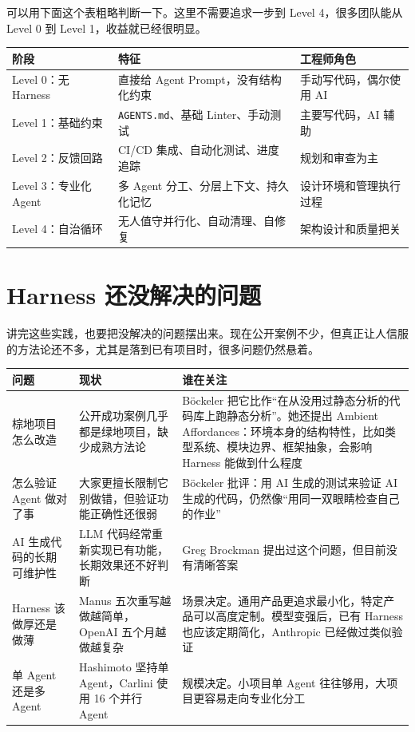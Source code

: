 \documentclass[10pt,a4paper]{ctexart}
\begin{document}
可以用下面这个表粗略判断一下。这里不需要追求一步到 Level 4，很多团队能从 Level 0 到 Level 1，收益就已经很明显。


{\footnotesize
\begin{tabularx}{\textwidth}{|X|X|X|}
\hline
\textbf{阶段} & \textbf{特征} & \textbf{工程师角色} \\
\hline
Level 0：无 Harness & 直接给 Agent Prompt，没有结构化约束 & 手动写代码，偶尔使用 AI \\
\hline
Level 1：基础约束 & \texttt{AGENTS.md}、基础 Linter、手动测试 & 主要写代码，AI 辅助 \\
\hline
Level 2：反馈回路 & CI/CD 集成、自动化测试、进度追踪 & 规划和审查为主 \\
\hline
Level 3：专业化 Agent & 多 Agent 分工、分层上下文、持久化记忆 & 设计环境和管理执行过程 \\
\hline
Level 4：自治循环 & 无人值守并行化、自动清理、自修复 & 架构设计和质量把关 \\
\hline
\end{tabularx}
}



\section{Harness 还没解决的问题}


讲完这些实践，也要把没解决的问题摆出来。现在公开案例不少，但真正让人信服的方法论还不多，尤其是落到已有项目时，很多问题仍然悬着。


{\footnotesize
\begin{tabularx}{\textwidth}{|X|X|X|}
\hline
\textbf{问题} & \textbf{现状} & \textbf{谁在关注} \\
\hline
棕地项目怎么改造 & 公开成功案例几乎都是绿地项目，缺少成熟方法论 & Böckeler 把它比作“在从没用过静态分析的代码库上跑静态分析”。她还提出 Ambient Affordances：环境本身的结构特性，比如类型系统、模块边界、框架抽象，会影响 Harness 能做到什么程度 \\
\hline
怎么验证 Agent 做对了事 & 大家更擅长限制它别做错，但验证功能正确性还很弱 & Böckeler 批评：用 AI 生成的测试来验证 AI 生成的代码，仍然像“用同一双眼睛检查自己的作业” \\
\hline
AI 生成代码的长期可维护性 & LLM 代码经常重新实现已有功能，长期效果还不好判断 & Greg Brockman 提出过这个问题，但目前没有清晰答案 \\
\hline
Harness 该做厚还是做薄 & Manus 五次重写越做越简单，OpenAI 五个月越做越复杂 & 场景决定。通用产品更追求最小化，特定产品可以高度定制。模型变强后，已有 Harness 也应该定期简化，Anthropic 已经做过类似验证 \\
\hline
单 Agent 还是多 Agent & Hashimoto 坚持单 Agent，Carlini 使用 16 个并行 Agent & 规模决定。小项目单 Agent 往往够用，大项目更容易走向专业化分工 \\
\hline
\end{tabularx}
}
\end{document}
